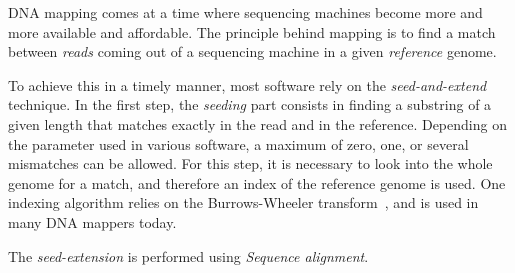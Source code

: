 DNA mapping comes at a time where sequencing machines become more and more available and affordable. The principle behind mapping is to find a match between \emph{reads} coming out of a sequencing machine in a given \emph{reference} genome. 

To achieve this in a timely manner, most software rely on the \emph{seed-and-extend} technique. In the first step, the \emph{seeding} part consists in finding a substring of a given length that matches exactly in the read and in the reference. Depending on the parameter used in various software, a maximum of zero, one, or several mismatches can be allowed. For this step, it is necessary to look into the whole genome for a match, and therefore an index of the reference genome is used. One indexing algorithm relies on the Burrows-Wheeler transform~\cite{BurrowsWheeler:align}, and is used in many DNA mappers today.

The \emph{seed-extension} is performed using \emph{Sequence alignment}.  


